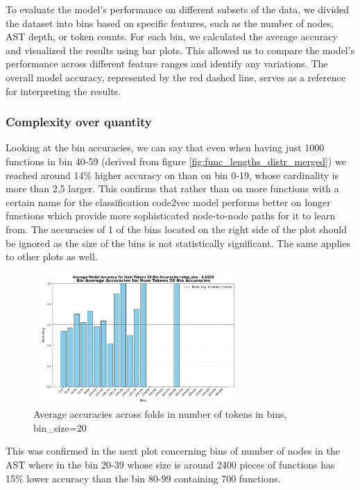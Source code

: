 \documentclass[10pt,english,a4paper]{report}
\begin{document}
To evaluate the model's performance on different subsets of the data, 
we divided the dataset into bins based on specific features, such as 
the number of nodes, AST depth, or token counts. For each bin, we 
calculated the average accuracy and visualized the results using bar 
plots. This allowed us to compare the model's performance across 
different feature ranges and identify any variations. The overall 
model accuracy, represented by the red dashed line, serves as a 
reference for interpreting the results. \\

\subsubsection{Complexity over quantity}

Looking at the bin accuracies, we can say that even when having just 1000 functions in 
bin 40-59 (derived from figure \ref{fig:func_lengths_distr_merged}) we reached around 14\% 
higher accuracy on than on bin 0-19, whose cardinality is more than 2,5 larger.
This confirms that rather than on more functions with a certain name for the classification
code2vec model performs better on longer functions which provide more sophisticated 
node-to-node paths for it to learn from. The accuracies of 1 of the bins located on the right side of 
the plot should be ignored as the size of the bins is not statistically significant. The same 
applies to other plots as well.

\begin{figure}[H]
    \centering
    \includegraphics[width=8cm, height=5cm]{figures/testing/bins/num_tokens_20_bin_accuracies.pdf}
    \caption{Average accuracies across folds in number of tokens in bins, bin\_size=20}
    \label{fig:bins_tokens}
\end{figure}

This was confirmed in the next plot concerning bins of number of nodes in the AST where in the bin 20-39 whose size is 
around 2400 pieces of functions has 15\% lower accuracy than the bin 80-99 containing 700 functions.
\end{document}
